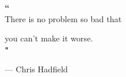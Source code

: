 \documentclass[a4paper,12pt,oneside,openright]{report}
\begin{document}
\onehalfspacing


\vspace{4cm}
\begin{center}
{\Huge \noindent \textbf{\textcolor{sections}{``}}}\\
\vspace{0.6cm}
{\huge There is no problem so bad that}

{\vspace{0.5cm}\huge you can't make it worse.}\\

{\vspace{0.8cm}\Huge \noindent \textbf{\textcolor{sections}{"}}}\\

\end{center}

{\hspace{7cm}\large --- Chris Hadfield}

\restoregeometry 

\tableofcontents \clearpage
\listoffigures \clearpage
\listoftables \clearpage

\clearpage

\clearpage

\clearpage

\clearpage




 \setcounter{page}{1}
\renewcommand{\chaptermark}[1]{\markboth{\bf{ #1}}{}} 
\renewcommand{\sectionmark}[1]{\markright{\thesection\emph{ #1}}{}} 

 \pagestyle{fancy}			 %
 \fancyfoot{}				 %
 \renewcommand{\chaptermark}[1]{	 %
   \markright{{\bf\chaptername\ \thechapter.}\ #1}{}} %
 \renewcommand{\sectionmark}[1]{	 %
   \markright{\thesection.\ #1}}	 %
 \fancyhead[RE,RO]{\bfseries\thepage}	 %
\fancyhead[LE]{\bfseries\rightmark}	 %
\fancyhead[LO]{\bfseries\rightmark}	 %
 \renewcommand{\headrulewidth}{0.3pt}	 %
\end{document}
